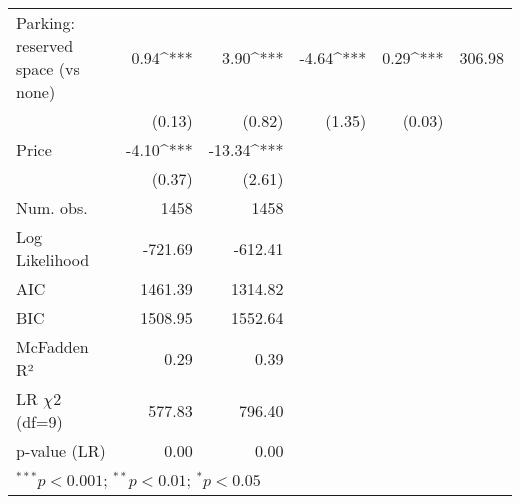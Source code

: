 \begin{table}[h]
\begin{center}
\begin{tabular}{l D{.}{.}{4.5} D{.}{.}{4.5} D{.}{.}{2.5} D{.}{.}{2.5} D{.}{.}{3.2}}
Parking: reserved space (vs none)  & 0.94^{***}  & 3.90^{***}   & -4.64^{***} & 0.29^{***} & 306.98 \\
                                   & (0.13)      & (0.82)       & (1.35)      & (0.03)     &        \\
Price                              & -4.10^{***} & -13.34^{***} &             &            &        \\
                                   & (0.37)      & (2.61)       &             &            &        \\
\midrule
Num. obs.                          & 1458        & 1458         &             &            &        \\
Log Likelihood                     & -721.69     & -612.41      &             &            &        \\
AIC                                & 1461.39     & 1314.82      &             &            &        \\
BIC                                & 1508.95     & 1552.64      &             &            &        \\
McFadden R²                        & 0.29        & 0.39         &             &            &        \\
LR $\chi 2$ (df=9)                       & 577.83      & 796.40       &             &            &        \\
p-value (LR)                       & 0.00        & 0.00         &             &            &        \\
\bottomrule
{}
\end{tabular}
\end{center}
\end{table}
